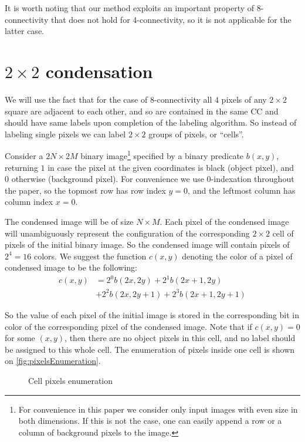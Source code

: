 \documentclass[hidelinks]{llncs}
\begin{document}
It is worth noting that our method exploits an important property of
8-connectivity that does not hold for 4-connectivity, so it is not applicable
for the latter case.

\section{$2 \times 2$ condensation}

We will use the fact that for the case of 8-connectivity all $4$ pixels of any
$2 \times 2$ square are adjacent to each other, and so are contained in the
same CC and should have same labels upon completion of the labeling algorithm.
So instead of labeling single pixels we can label $2 \times 2$ groups of
pixels, or ``cells''.

Consider a $2N \times 2M$ binary image\footnote{
For convenience in this paper we consider only input images with even size
in both dimensions. If this is not the case, one can easily append a row or
a column of background pixels to the image.}
specified by a binary predicate $b(x, y)$,
returning $1$ in case the pixel at the given coordinates is black (object
pixel), and $0$ otherwise (background pixel). For convenience we use
0-indexation throughout the paper, so the topmost row has row index $y=0$, and
the leftmost column has column index $x=0$.

The condensed image will be of size $N \times M$.
Each pixel of the condensed image will unambiguously represent the configuration
of the corresponding $2 \times 2$ cell of pixels of the initial binary image.
So the condensed image will contain pixels of $2^4 = 16$ colors.
We suggest the function $c(x, y)$ denoting the color of a pixel of condensed
image to be the following:
\begin{align*}
  c(x, y) &= 2^0 b(2x, 2y)   + 2^1 b(2x+1, 2y) \\
          &+ {} 2^2 b(2x, 2y+1) + 2^3 b(2x+1,2y+1)
\end{align*}

So the value of each pixel of the initial image is stored in the corresponding
bit in color of the corresponding pixel of the condensed image.
Note that if $c(x, y) = 0$ for some $(x, y)$, then there are no object pixels
in this cell, and no label should be assigned to this whole cell. The
enumeration of pixels inside one cell is shown on
\autoref{fig:pixelsEnumeration}.

\begin{figure}[t]
  \centering
  \caption{Cell pixels enumeration}
  \label{fig:pixelsEnumeration}
\end{figure}
\end{document}
